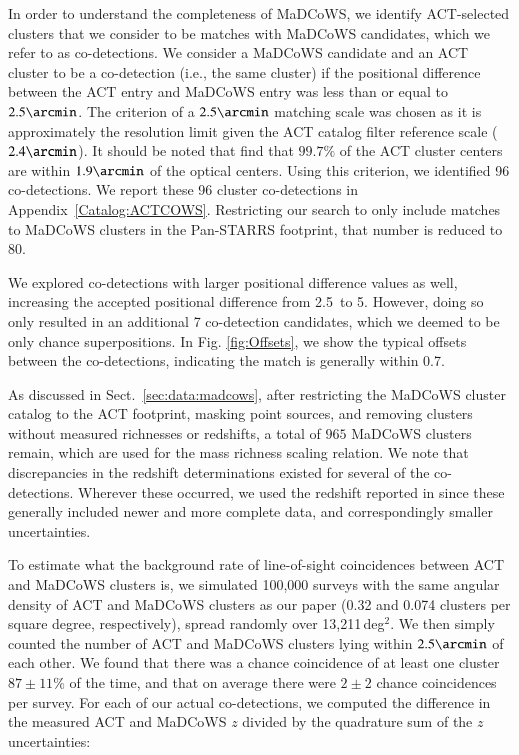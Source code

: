 \documentclass[longauth]{aa} %
\newcommand{\madcows}{MaDCoWS\xspace}
\begin{document}
In order to understand the completeness of MaDCoWS, we identify ACT-selected clusters that we consider to be matches with MaDCoWS candidates, which we refer to as co-detections. We consider a MaDCoWS candidate and an ACT cluster to be a co-detection (i.e., the same cluster) if the positional difference between the ACT entry and MaDCoWS entry was less than or equal to $2.5\arcmin$. The criterion of a $2.5\arcmin$ matching scale was chosen as it is approximately the resolution limit given the ACT catalog filter reference scale ($2.4\arcmin$). It should be noted that \citet{Hilton2021} find that $99.7\%$ of the ACT cluster centers are within $1.9\arcmin$ of the optical centers. Using this criterion, we identified 96 co-detections. We report these 96 cluster co-detections in Appendix~\ref{Catalog:ACTCOWS}. Restricting our search to only include matches to MaDCoWS clusters in the Pan-STARRS footprint, that number is reduced to 80.

We explored co-detections with larger positional difference values as well, increasing the accepted positional difference from 2.5\arcmin\ to 5\arcmin. However, doing so only resulted in an additional 7 co-detection candidates, which we deemed to be only chance superpositions.  In Fig. \ref{fig:Offsets}, we show the typical offsets between the co-detections, indicating the match is generally within 0.7\arcmin.

As discussed in Sect.~\ref{sec:data:madcows}, after restricting the MaDCoWS cluster catalog to the ACT footprint, masking point sources, and removing clusters without measured richnesses or redshifts, a total of $965$ MaDCoWS clusters remain, which are used for the mass richness scaling relation. We note that discrepancies in the redshift determinations existed for several of the co-detections.  Wherever these occurred, we used the redshift reported in \cite{Hilton2021} since these generally included newer and more complete data, and correspondingly smaller uncertainties.

To estimate what the background rate of line-of-sight coincidences between ACT and \madcows clusters is, we simulated 100,000 surveys with the same angular density of ACT and MaDCoWS clusters as our paper (0.32 and 0.074 clusters per square degree, respectively), spread randomly over 13,211\,deg$^2$. We then simply counted the number of ACT and MaDCoWS clusters lying within $2.5\arcmin$ of each other. We found that there was a chance coincidence of at least one cluster $87\pm 11\%$ of the time, and that on average there were $2\pm 2$ chance coincidences per survey. For each of our actual co-detections, we computed the difference in the measured ACT and MaDCoWS $z$ divided by the quadrature sum of the $z$ uncertainties:
\end{document}
